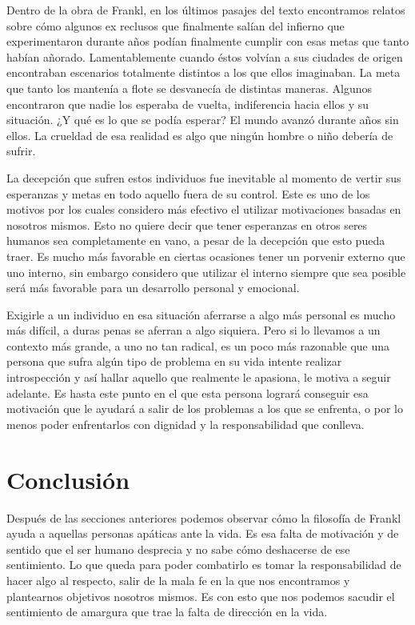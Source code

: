 \documentclass[12pt, letterpaper]{article}
\begin{document}
Dentro de la obra de Frankl, en los últimos pasajes del texto encontramos relatos sobre cómo algunos ex reclusos que finalmente salían del infierno que experimentaron durante años podían finalmente cumplir con esas metas que tanto habían añorado. Lamentablemente cuando éstos volvían a sus ciudades de origen encontraban escenarios totalmente distintos a los que ellos imaginaban. La meta que tanto los mantenía a flote se desvanecía de distintas maneras. Algunos encontraron que nadie los esperaba de vuelta, indiferencia hacia ellos y su situación. ¿Y qué es lo que se podía esperar? El mundo avanzó durante años sin ellos. La crueldad de esa realidad es algo que ningún hombre o niño debería de sufrir.

La decepción que sufren estos individuos fue inevitable al momento de vertir sus esperanzas y metas en todo aquello fuera de su control. Este es uno de los motivos por los cuales considero más efectivo el utilizar motivaciones basadas en nosotros mismos. Esto no quiere decir que tener esperanzas en otros seres humanos sea completamente en vano, a pesar de la decepción que esto pueda traer. Es mucho más favorable en ciertas ocasiones tener un porvenir externo que uno interno, sin embargo considero que utilizar el interno siempre que sea posible será más favorable para un desarrollo personal y emocional. 

Exigirle a un individuo en esa situación aferrarse a algo más personal es mucho más difícil, a duras penas se aferran a algo siquiera. Pero si lo llevamos a un contexto más grande, a uno no tan radical, es un poco más razonable que una persona que sufra algún tipo de problema en su vida intente realizar introspección y así hallar aquello que realmente le apasiona, le motiva a seguir adelante. Es hasta este punto en el que esta persona logrará conseguir esa motivación que le ayudará a salir de los problemas a los que se enfrenta, o por lo menos poder enfrentarlos con dignidad y la responsabilidad que conlleva.
\newpage

\section*{Conclusión}

Después de las secciones anteriores podemos observar cómo la filosofía de Frankl ayuda a aquellas personas apáticas ante la vida. Es  esa falta de motivación y de sentido que el ser humano desprecia y no sabe cómo deshacerse de ese sentimiento. Lo que queda para poder combatirlo es tomar la responsabilidad de hacer algo al respecto, salir de la mala fe en la que nos encontramos y plantearnos objetivos nosotros mismos. Es con esto que nos podemos sacudir el sentimiento de amargura que trae la falta de dirección en la vida. 
\end{document}
